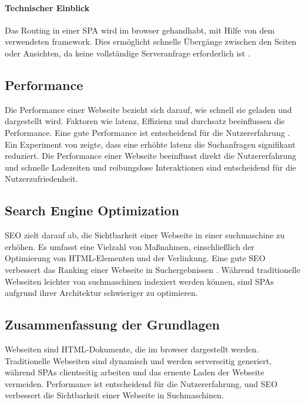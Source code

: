 \paragraph*{Technischer Einblick}
Das Routing in einer \ac{SPA} wird im \gls{browser} gehandhabt, mit Hilfe von dem verwendeten \gls{framework}.
Dies ermöglicht schnelle Übergänge zwischen den Seiten oder Ansichten, da keine vollständige Serveranfrage erforderlich ist \cite{Scott2015}.

\subsection{Performance}
Die Performance einer Webseite bezieht sich darauf, wie schnell sie geladen und dargestellt wird.
Faktoren wie \gls{latenz}, Effizienz und \gls{durchsatz} beeinflussen die Performance.
Eine gute Performance ist entscheidend für die Nutzererfahrung \cite{Killelea2002}.
Ein Experiment von  \cite{Google2009} zeigte, dass eine erhöhte \gls{latenz} die Suchanfragen signifikant reduziert.
Die Performance einer Webseite beeinflusst direkt die Nutzererfahrung und schnelle Ladezeiten und reibungslose Interaktionen sind entscheidend für die Nutzerzufriedenheit.

\subsection{Search Engine Optimization}
\ac{SEO} zielt darauf ab, die Sichtbarkeit einer Webseite in einer \gls{suchmaschine} zu erhöhen.
Es umfasst eine Vielzahl von Maßnahmen, einschließlich der Optimierung von \ac{HTML}-Elementen und der Verlinkung.
Eine gute \ac{SEO} verbessert das Ranking einer Webseite in Suchergebnissen \cite{John2016}.
Während traditionelle Webseiten leichter von \gls{suchmaschine}n indexiert werden können, sind \ac{SPA}s aufgrund ihrer Architektur schwieriger zu optimieren.

\subsection*{Zusammenfassung der Grundlagen}
Webseiten sind \ac{HTML}-Dokumente, die im \gls{browser} dargestellt werden.
Traditionelle Webseiten sind dynamisch und werden serverseitig generiert, während \ac{SPA}s clientseitig arbeiten und das erneute Laden der Webseite vermeiden.
Performance ist entscheidend für die Nutzererfahrung, und \ac{SEO} verbessert die Sichtbarkeit einer Webseite in Suchmaschinen.

